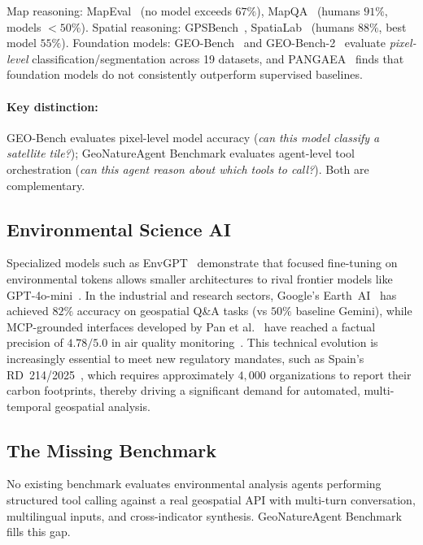\documentclass[sigconf]{acmart}
\begin{document}
Map reasoning: MapEval~\citep{dihan2025mapeval} (no model exceeds $67\%$), MapQA~\citep{arnold2025mapqa} (humans $91\%$, models $<50\%$). Spatial reasoning: GPSBench~\citep{truong2026gpsbench}, SpatiaLab~\citep{wasi2026spatialab} (humans $88\%$, best model $55\%$). Foundation models: GEO-Bench~\citep{lacoste2023geobench} and GEO-Bench-2~\citep{simumba2025geobench2} evaluate \emph{pixel-level} classification/segmentation across 19 datasets, and PANGAEA~\citep{marsocci2024pangaea} finds that foundation models do not consistently outperform supervised baselines.

\paragraph{Key distinction:}
GEO-Bench evaluates pixel-level model accuracy (\emph{can this model classify a satellite tile?}); GeoNatureAgent Benchmark evaluates agent-level tool orchestration (\emph{can this agent reason about which tools to call?}). Both are complementary.


\subsection{Environmental Science AI}

Specialized models such as EnvGPT~\citep{zhang2025envgpt} demonstrate that focused fine-tuning on environmental tokens allows smaller architectures to rival frontier models like GPT-4o-mini~\citep{zhang2025envgpt}. In the industrial and research sectors, Google’s Earth~AI~\citep{google2025earthai} has achieved $82\%$ accuracy on geospatial Q\&A tasks (vs $50\%$ baseline Gemini), while MCP-grounded interfaces developed by Pan et al.~\citep{pan2025mcpairquality} have reached a factual precision of $4.78/5.0$ in air quality monitoring~\citep{pan2025mcpairquality}. This technical evolution is increasingly essential to meet new regulatory mandates, such as Spain’s RD~214/2025~\citep{spain2025rd214}, which requires approximately $4,000$ organizations to report their carbon footprints, thereby driving a significant demand for automated, multi-temporal geospatial analysis.


\subsection{The Missing Benchmark}

No existing benchmark evaluates environmental analysis agents performing structured tool calling against a real geospatial API with multi-turn conversation, multilingual inputs, and cross-indicator synthesis. GeoNatureAgent Benchmark fills this gap.
\end{document}

